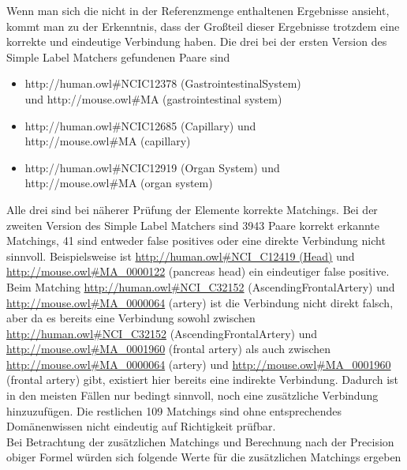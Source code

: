 		Wenn man sich die nicht in der Referenzmenge enthaltenen Ergebnisse ansieht,
		kommt man zu der Erkenntnis, dass der Großteil dieser Ergebnisse trotzdem eine
		korrekte und eindeutige Verbindung haben. Die drei bei der ersten Version des
		Simple Label Matchers gefundenen Paare sind
		\begin{itemize}
		  \item http://human.owl\#NCI\textunderscore C12378
		  (Gastrointestinal\textunderscore System)\\ und
		  http://mouse.owl\#MA (gastrointestinal system)
		  \item http://human.owl\#NCI\textunderscore C12685 (Capillary) und\\
		  http://mouse.owl\#MA (capillary)
		  \item http://human.owl\#NCI\textunderscore C12919 (Organ\textunderscore
		  System) und\\ http://mouse.owl\#MA (organ system)
		\end{itemize}
		Alle drei sind bei näherer Prüfung der Elemente korrekte Matchings. Bei der
		zweiten Version des Simple Label Matchers sind 3943 Paare korrekt erkannte
		Matchings, 41 sind entweder false positives oder eine direkte Verbindung nicht
		sinnvoll. Beispielsweise ist \url{http://human.owl#NCI_C12419 (Head)} und
		\url{http://mouse.owl#MA_0000122} (pancreas head) ein eindeutiger false
		positive. Beim Matching \url{http://human.owl#NCI_C32152}
		(Ascending\textunderscore Frontal\textunderscore Artery) und \url{http://mouse.owl#MA_0000064} (artery)
		ist die Verbindung nicht direkt falsch, aber da es bereits eine Verbindung
		sowohl zwischen \url{http://human.owl#NCI_C32152} (Ascending\textunderscore Frontal\textunderscore Artery)
		und \url{http://mouse.owl#MA_0001960} (frontal artery) als auch zwischen
		\url{http://mouse.owl#MA_0000064} (artery) und
		\url{http://mouse.owl#MA_0001960} (frontal artery) gibt, existiert hier
		bereits eine indirekte Verbindung. Dadurch ist in den meisten Fällen nur
		bedingt sinnvoll, noch eine zusätzliche Verbindung hinzuzufügen. Die
		restlichen 109 Matchings sind ohne entsprechendes Domänenwissen nicht
		eindeutig auf Richtigkeit prüfbar.\\
		Bei Betrachtung der zusätzlichen Matchings und Berechnung nach der Precision
		obiger Formel würden sich folgende Werte für die zusätzlichen Matchings
		ergeben
		\begin{center}
		\begin{table}[h!]
		\small
		\noindent{}
		\caption{Vergleich 3 Simple Ontology Matcher OAEI16 Referenz}
		\end{table}
		\end{center}
